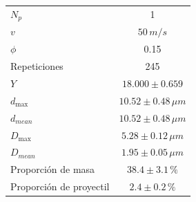 \begin{tabular}{lc}
$N_p$ & 1 \\
$v$ & $50\,m/s$ \\
$\phi$ & 0.15 \\
Repeticiones & 245 \\
\hline
$Y$ & $18.000\pm0.659$ \\
$d_{\max}$ & $10.52\pm0.48\,\mu m$ \\
$d_{mean}$ & $10.52\pm0.48\,\mu m$ \\
$D_{\max}$ & $5.28\pm0.12\,\mu m$ \\
$D_{mean}$ & $1.95\pm0.05\,\mu m$ \\
Proporci\'on de masa & $38.4\pm3.1\,\%$ \\
Proporci\'on de proyectil & $2.4\pm0.2\,\%$ \\
\end{tabular}